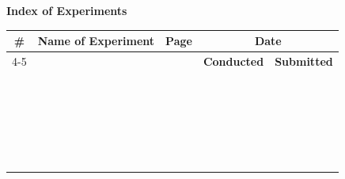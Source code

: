 \documentclass[12pt]{report}
\begin{document}
\thispagestyle{empty}
\titleGP
\clearpage

\thispagestyle{empty}
\begin{center}
	{\huge\textbf{Index of Experiments}} \\[1em]
	\hrulefill
\end{center}
\vspace{1cm}

\begin{table}[H]
	\centering
	\begin{tabular}{|c|p{7.8cm}|c|c|c|}
		\hline
		\multirow{2}{*}{\textbf{\#}}& \multirow{2}{*}{\textbf{Name of Experiment}}& \multirow{2}{*}{\textbf{Page}}& \multicolumn{2}{|c|}{\textbf{Date}}\\ \cline{4-5}
					    & & &\textbf{Conducted}& \textbf{Submitted}\\ \hline
		&&&&\\
		&&&&\\ \hline
		&&&&\\
		&&&&\\ \hline
		&&&&\\
		&&&&\\ \hline
		&&&&\\
		&&&&\\ \hline
		&&&&\\
		&&&&\\ \hline
		&&&&\\
		&&&&\\ \hline
		&&&&\\
		&&&&\\ \hline
		&&&&\\
		&&&&\\ \hline
		&&&&\\
		&&&&\\ \hline
		&&&&\\
		&&&&\\ \hline
		&&&&\\
		&&&&\\ \hline
		&&&&\\
		&&&&\\ \hline
	\end{tabular}
\end{table}

\pagestyle{fancy}

\clearpage
















\end{document}
